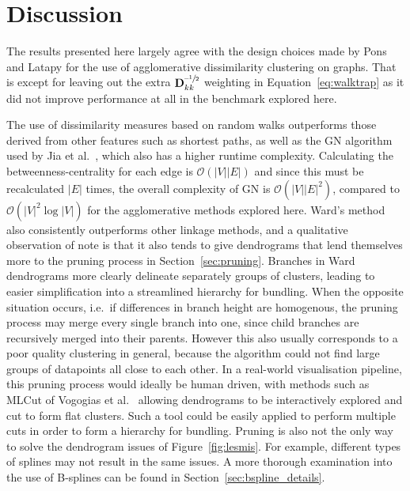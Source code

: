 \section{Discussion}
\label{sec:heb_discussion}
The results presented here largely agree with the design choices made by Pons and Latapy \cite{Pons2006} for the use of agglomerative dissimilarity clustering on graphs. That is except for leaving out the extra $\mathbf{D}_{kk}^{\text{--}\sfrac{1}{2}}$ weighting in Equation~\ref{eq:walktrap} as it did not improve performance at all in the benchmark explored here.

The use of dissimilarity measures based on random walks outperforms those derived from other features such as shortest paths, as well as the GN algorithm used by Jia et al.\ \cite{Jia2011}, which also has a higher runtime complexity.
Calculating the betweenness-centrality for each edge is $\mathcal{O}(|V||E|)$ \cite{Brandes2001Centrality} and since this must be recalculated $|E|$ times, the overall complexity of GN is $\mathcal{O}(|V||E|^2)$, compared to $\mathcal{O}(|V|^2\log|V|)$ for the agglomerative methods explored here.
Ward's method also consistently outperforms other linkage methods, and a qualitative observation of note is that it also tends to give dendrograms that lend themselves more to the pruning process in Section~\ref{sec:pruning}. Branches in Ward dendrograms more clearly delineate separately groups of clusters, leading to easier simplification into a streamlined hierarchy for bundling.
When the opposite situation occurs, i.e.\ if differences in branch height are homogenous, the pruning process may merge every single branch into one, since child branches are recursively merged into their parents. However this also usually corresponds to a poor quality clustering in general, because the algorithm could not find large groups of datapoints all close to each other.
In a real-world visualisation pipeline, this pruning process would ideally be human driven, with methods such as MLCut of Vogogias et al.\ \cite{Vogogias2016} allowing dendrograms to be interactively explored and cut to form flat clusters. Such a tool could be easily applied to perform multiple cuts in order to form a hierarchy for bundling.
Pruning is also not the only way to solve the dendrogram issues of Figure~\ref{fig:lesmis}. For example, different types of splines may not result in the same issues. A more thorough examination into the use of B-splines can be found in Section~\ref{sec:bspline_details}.

